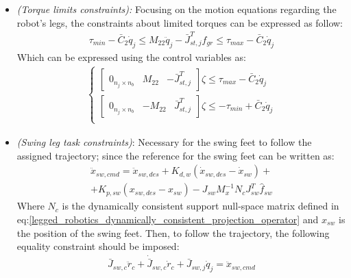 \begin{itemize}
\begin{gather*}
\begin{bmatrix}
            -(\bar{l}_{2,i}+\mu\bar{n}_i)^{T}f_{gr,i}\leq0\\
        \end{bmatrix}
    \end{gather*}
    \item \textit{(Torque limits constraints):}
    Focusing on the motion equations regarding the robot’s legs, the constraints about limited torques can be expressed as follow:
    \begin{gather*}
        \tau_{min}-\bar{C}_2\dot{q}_j\leq M_{22}\ddot{q}_j-\bar{J}_{st,j}^{T}f_{gr}\leq \tau_{max}-\bar{C}_2\dot{q}_j
    \end{gather*}
    Which can be expressed using the control variables as:
    \begin{gather}\label{legged_robot_torque_limits_constraints}
        \begin{cases}
            \begin{bmatrix}
                0_{n_j\times n_b}& M_{22} & -\bar{J}_{st,j}^{T}
            \end{bmatrix}\zeta\leq \tau_{max}-\bar{C}_{2}\dot{q}_j\\
            \begin{bmatrix}
                0_{n_j\times n_b}& -M_{22} & \bar{J}_{st,j}^{T}
            \end{bmatrix}\zeta\leq -\tau_{min}+\bar{C}_{2}\dot{q}_j\\
        \end{cases}
    \end{gather}
    \item \textit{(Swing leg task constraints)}:
    Necessary for the swing feet to follow the assigned trajectory; since the reference for the swing feet can be written as:
    \begin{gather*}
        \ddot{x}_{sw,cmd}=\ddot{x}_{sw,des}+K_{d,w}(\dot{x}_{sw,des}-\dot{x}_{sw})+\\+K_{p,sw}(x_{sw,des}-x_{sw})-J_{sw}M_{x}^{-1}N_{c}J_{sw}^{T}\hat{f}_{sw}
    \end{gather*}
    Where $N_c$ is the dynamically consistent support null-space matrix defined in eq:\ref{legged_robotics_dynamically_consistent_projection_operator} and $x_{sw}$ is the position of the swing feet. Then, to follow the trajectory, the following equality constraint should be imposed:
    \begin{gather*}
        \bar{J}_{sw,c}\ddot{r}_{c}+\dot{\bar{J}}_{sw,c}\dot{r}_{c}+\bar{J}_{sw,j}\dot{q}_{j}=\ddot{x}_{sw,cmd}
    \end{gather*}

\end{itemize}
